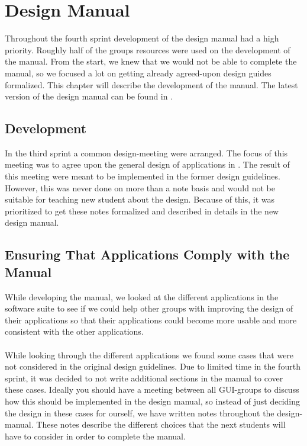 
\chapter{Design Manual}
\label{cha:design_manual}

Throughout the fourth sprint development of the design manual had a high priority. Roughly half of the groups resources were used on the development of the manual. From the start, we knew that we would not be able to complete the manual, so we focused a lot on getting already agreed-upon design guides formalized. This chapter will describe the development of the manual. The latest version of the design manual can be found in .

\section{Development}
\label{sec:development}
In the third sprint a common design-meeting were arranged. The focus of this meeting was to agree upon the general design of applications in \giraf. The result of this meeting were meant to be implemented in the former design guidelines. However, this was never done on more than a note basis and would not be suitable for teaching new student about the design. Because of this, it was prioritized to get these notes formalized and described in details in the new design manual. 

\section{Ensuring That Applications Comply with the Manual}
\label{sec:ensuring_that_applications_comply_with_the_manual}
While developing the manual, we looked at the different applications in the \giraf software suite to see if we could help other groups with improving the design of their applications so that their applications could become more usable and more consistent with the other applications. 
\\\\
While looking through the different applications we found some cases that were not considered in the original design guidelines. Due to limited time in the fourth sprint, it was decided to not write additional sections in the manual to cover these cases. Ideally you should have a meeting between all GUI-groups to discuss how this should be implemented in the design manual, so instead of just deciding the design in these cases for ourself, we have written notes throughout the design-manual. These notes describe the different choices that the next students will have to consider in order to complete the manual. 